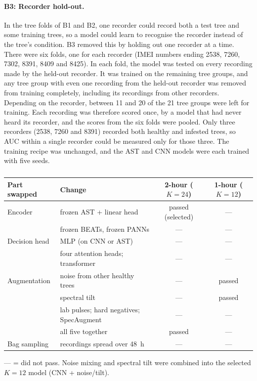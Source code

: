 \paragraph{B3: Recorder hold-out.} In the tree folds of B1 and B2, one recorder could record both a test tree and some training trees, so a model could learn to recognise the recorder instead of the tree's condition. B3 removed this by holding out one recorder at a time. There were six folds, one for each recorder (IMEI numbers ending 2538, 7260, 7302, 8391, 8409 and 8425). In each fold, the model was tested on every recording made by the held-out recorder. It was trained on the remaining tree groups, and any tree group with even one recording from the held-out recorder was removed from training completely, including its recordings from other recorders. Depending on the recorder, between 11 and 20 of the 21 tree groups were left for training. Each recording was therefore scored once, by a model that had never heard its recorder, and the scores from the six folds were pooled. Only three recorders (2538, 7260 and 8391) recorded both healthy and infested trees, so AUC within a single recorder could be measured only for those three. The training recipe was unchanged, and the AST and CNN models were each trained with five seeds.

\begin{table}[htbp]
\centering
\color{black}
\small
\caption{}
\label{tab:ml_b2}
\footnotesize
\setlength{\tabcolsep}{4pt}
\begin{tabular}{llcc}
\toprule
Part swapped & Change & 2-hour ($K=24$) & 1-hour ($K=12$) \\
\midrule
Encoder & frozen AST + linear head & passed (selected) & --- \\
 & frozen BEATs, frozen PANNs & --- & --- \\
Decision head & MLP (on CNN or AST) & --- & --- \\
 & four attention heads; transformer & --- & --- \\
Augmentation & noise from other healthy trees & --- & passed \\
 & spectral tilt & --- & passed \\
 & lab pulses; hard negatives; SpecAugment & --- & --- \\
 & all five together & passed & --- \\
Bag sampling & recordings spread over 48~h & --- & --- \\
\bottomrule
\end{tabular}

\smallskip
\parbox{0.9\linewidth}{\footnotesize --- = did not pass. Noise mixing and spectral tilt were combined into the selected $K=12$ model (CNN + noise/tilt).}
\end{table}


